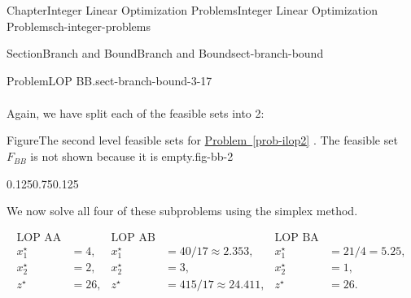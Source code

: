 \documentclass[oneside,10pt,]{book}
\newcommand{\xreffont}{\relax}
\numberwithin{equation}{section}
\newcommand{\amp}{&}
\begin{document}
\begin{chapterptx}{Chapter}{Integer Linear Optimization Problems}{}{Integer Linear Optimization Problems}{}{}{ch-integer-problems}
\begin{sectionptx}{Section}{Branch and Bound}{}{Branch and Bound}{}{}{sect-branch-bound}
\begin{introduction}{}
\begin{problem}{Problem}{LOP BB.}{sect-branch-bound-3-17}
\begin{equation*}
\begin{aligned}
\end{aligned}
\end{equation*}
%
\end{problem}
Again, we have split each of the feasible sets into 2:%
\begin{figureptx}{Figure}{The second level feasible sets for \hyperref[prob-ilop2]{Problem~{\xreffont\ref{prob-ilop2}}} . The feasible set \(F_{BB}\) is not shown because it is empty.}{fig-bb-2}{}%
\begin{image}{0.125}{0.75}{0.125}{}%
%
\end{image}%
\tcblower
\end{figureptx}%
We now solve all four of these subproblems using the simplex method.%
\par
%
\begin{align*}
\text{LOP AA} \amp\amp\text{LOP AB} \amp \amp \text{LOP BA}\\
x_1^{\star} \amp = 4, \amp x_1^{\star} \amp = 40/17\approx 2.353, \amp   x_1^{\star} \amp = 21/4 =5.25, \\
x_2^{\star} \amp = 2, \amp x_2^{\star} \amp = 3, \amp  x_2^{\star} \amp =1, \\
z^{\star} \amp = 26, \amp z^{\star} \amp = 415/17 \approx 24.411, \amp z^{\star} \amp = 26.
\end{align*}
%
\par

\end{introduction}
\end{sectionptx}
\end{chapterptx}
\end{document}
